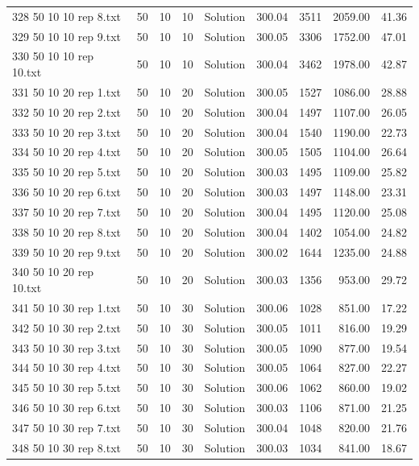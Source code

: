 \begin{longtable}{lrrllrrrr}
328 50 10 10 rep 8.txt & 50 & 10 & 10 & Solution & 300.04 & 3511 & 2059.00 & 41.36\\
329 50 10 10 rep 9.txt & 50 & 10 & 10 & Solution & 300.05 & 3306 & 1752.00 & 47.01\\
330 50 10 10 rep 10.txt & 50 & 10 & 10 & Solution & 300.04 & 3462 & 1978.00 & 42.87\\
331 50 10 20 rep 1.txt & 50 & 10 & 20 & Solution & 300.05 & 1527 & 1086.00 & 28.88\\
332 50 10 20 rep 2.txt & 50 & 10 & 20 & Solution & 300.04 & 1497 & 1107.00 & 26.05\\
333 50 10 20 rep 3.txt & 50 & 10 & 20 & Solution & 300.04 & 1540 & 1190.00 & 22.73\\
334 50 10 20 rep 4.txt & 50 & 10 & 20 & Solution & 300.05 & 1505 & 1104.00 & 26.64\\
335 50 10 20 rep 5.txt & 50 & 10 & 20 & Solution & 300.03 & 1495 & 1109.00 & 25.82\\
336 50 10 20 rep 6.txt & 50 & 10 & 20 & Solution & 300.03 & 1497 & 1148.00 & 23.31\\
337 50 10 20 rep 7.txt & 50 & 10 & 20 & Solution & 300.04 & 1495 & 1120.00 & 25.08\\
338 50 10 20 rep 8.txt & 50 & 10 & 20 & Solution & 300.04 & 1402 & 1054.00 & 24.82\\
339 50 10 20 rep 9.txt & 50 & 10 & 20 & Solution & 300.02 & 1644 & 1235.00 & 24.88\\
340 50 10 20 rep 10.txt & 50 & 10 & 20 & Solution & 300.03 & 1356 & 953.00 & 29.72\\
341 50 10 30 rep 1.txt & 50 & 10 & 30 & Solution & 300.06 & 1028 & 851.00 & 17.22\\
342 50 10 30 rep 2.txt & 50 & 10 & 30 & Solution & 300.05 & 1011 & 816.00 & 19.29\\
343 50 10 30 rep 3.txt & 50 & 10 & 30 & Solution & 300.05 & 1090 & 877.00 & 19.54\\
344 50 10 30 rep 4.txt & 50 & 10 & 30 & Solution & 300.05 & 1064 & 827.00 & 22.27\\
345 50 10 30 rep 5.txt & 50 & 10 & 30 & Solution & 300.06 & 1062 & 860.00 & 19.02\\
346 50 10 30 rep 6.txt & 50 & 10 & 30 & Solution & 300.03 & 1106 & 871.00 & 21.25\\
347 50 10 30 rep 7.txt & 50 & 10 & 30 & Solution & 300.04 & 1048 & 820.00 & 21.76\\
348 50 10 30 rep 8.txt & 50 & 10 & 30 & Solution & 300.03 & 1034 & 841.00 & 18.67\\

\end{longtable}
